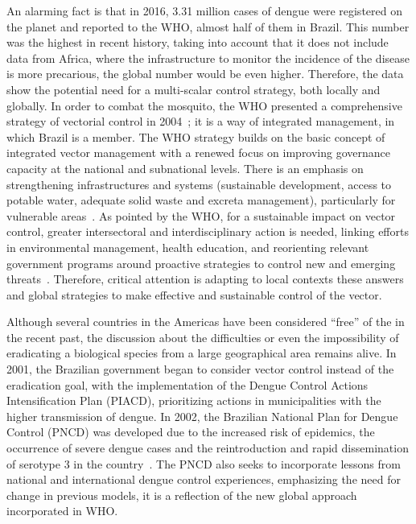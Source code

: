 An alarming fact is that in 2016, 3.31 million cases of dengue were registered on the planet and reported to the WHO, almost half of them in Brazil.
This number was the highest in recent history, taking into account that it does not include data from Africa, where the infrastructure to monitor the incidence of the disease is more precarious, the global number would be even higher.
Therefore, the data show the potential need for a multi-scalar \Aedes control strategy, both locally and globally.
In order to combat the mosquito, the WHO presented a comprehensive strategy of vectorial control in 2004~\cite{world2004global}; it is a way of integrated management, in which Brazil is a member.
%
The WHO strategy builds on the basic concept of integrated vector management with a renewed focus on improving governance capacity at the national and subnational levels.
There is an emphasis on strengthening infrastructures and systems (\eg sustainable development, access to potable water, adequate solid waste and excreta management), particularly for vulnerable areas~\cite{world2012global}.
As pointed by the WHO, for a sustainable impact on vector control, greater intersectoral and interdisciplinary action is needed, linking efforts in environmental management, health education, and reorienting relevant government programs around proactive strategies to control new and emerging threats~\cite{world2012global}.
Therefore, critical attention is adapting to local contexts these answers and global strategies to make effective and sustainable control of the vector.

Although several countries in the Americas have been considered “free” of the \Aedes in the recent past, the discussion about the difficulties or even the impossibility of eradicating a biological species from a large geographical area remains alive.
In 2001, the Brazilian government began to consider vector control instead of the eradication goal, with the implementation of the Dengue Control Actions Intensification Plan (PIACD), prioritizing actions in municipalities with the higher transmission of dengue. In 2002, the Brazilian National Plan for Dengue Control (PNCD) was developed due to the increased risk of epidemics, the occurrence of severe dengue cases and the reintroduction and rapid dissemination of serotype 3 in the country~\cite{web:pncdbrasil}.
The PNCD also seeks to incorporate lessons from national and international dengue control experiences, emphasizing the need for change in previous models, \ie it is a reflection of the new global approach incorporated in WHO.

